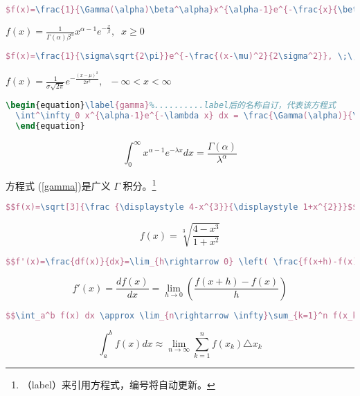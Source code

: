   \begin{lstlisting}[language=TeX,numbers=none,frame=lrtb,label=Gamma,caption=Gamma] 
  $f(x)=\frac{1}{\Gamma(\alpha)\beta^\alpha}x^{\alpha-1}e^{-\frac{x}{\beta}}, \;\; x\geq 0$
  \end{lstlisting}
  $f(x)=\frac{1}{\Gamma(\alpha)\beta^\alpha}x^{\alpha-1}e^{-\frac{x}{\beta}}, \;\; x\geq 0$ 
  
  \begin{lstlisting}[language=TeX,numbers=none,frame=lrtb,label=Normal,caption=Normal] 
  $f(x)=\frac{1}{\sigma\sqrt{2\pi}}e^{-\frac{(x-\mu)^2}{2\sigma^2}}, \;\;  -\infty < x < \infty $
  \end{lstlisting}
  $f(x)=\frac{1}{\sigma\sqrt{2\pi}}e^{-\frac{(x-\mu)^2}{2\sigma^2}}, \;\;  -\infty < x < \infty $
  
    \begin{lstlisting}[language=TeX,numbers=none,frame=lrtb,label=Int,caption=\song 积分式与方程式编号] 
  \begin{equation}\label{gamma}%..........label后的名称自订，代表该方程式
  \int^\infty_0 x^{\alpha-1}e^{-\lambda x} dx = \frac{\Gamma(\alpha)}{\lambda^{\alpha}}
  \end{equation}
  \end{lstlisting}
  \begin{equation}\label{gamma}%
  \int^\infty_0 x^{\alpha-1}e^{-\lambda x} dx = \frac{\Gamma(\alpha)}{\lambda^{\alpha}}
  \end{equation}
  
  方程式 (\ref{gamma})是广义 $\Gamma$ 积分。\footnote{（label）来引用方程式，编号将自动更新。}
  
  \begin{lstlisting}[language=TeX,numbers=none,frame=lrtb,label=Sqrt,caption=\song 开根号] 
  $$f(x)=\sqrt[3]{\frac {\displaystyle 4-x^{3}}{\displaystyle 1+x^{2}}}$$
  \end{lstlisting}
  $$f(x)=\sqrt[3]{\frac {\displaystyle 4-x^{3}}{\displaystyle 1+x^{2}}}$$
  
  \begin{lstlisting}[language=TeX,numbers=none,frame=lrtb,label=limit,caption=\song 微分与极限（注意大刮号的使用）] 
  $$f'(x)=\frac{df(x)}{dx}=\lim_{h\rightarrow 0} \left( \frac{f(x+h)-f(x)}{h} \right)$$
  \end{lstlisting}  
  $$f'(x)=\frac{df(x)}{dx}=\lim_{h\rightarrow 0}\left(\frac{f(x+h)-f(x)}{h}\right)$$
  
    \begin{lstlisting}[language=TeX,numbers=none,frame=lrtb,label=upanddown,caption=\song 上下限的使用] 
 $$\int_a^b f(x) dx \approx \lim_{n\rightarrow \infty}\sum_{k=1}^n f(x_k)\triangle x_k$$
  \end{lstlisting} 
  $$\int_a^b f(x) dx \approx \lim_{n\rightarrow \infty}\sum_{k=1}^n f(x_k)\triangle x_k$$
  
